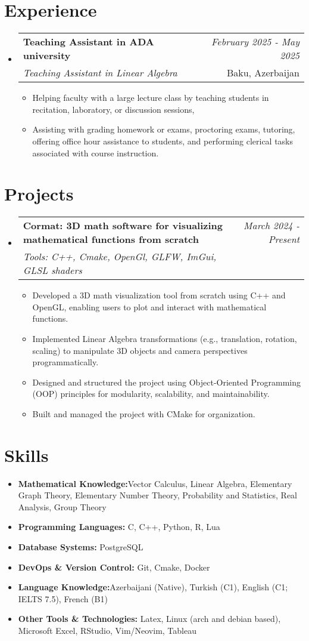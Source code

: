 \documentclass[a4paper,11pt]{article}
\makeatletter
\newcommand{\resumeItem}[2]{
\item{
        \textbf{#1}{\hspace{0.5mm}#2 \vspace{-0.5mm}}
    }
}
\newcommand{\resumeSubheading}[4]{
    \vspace{0.5mm}
\item
    \begin{tabular*}{0.98\textwidth}[t]{l@{\extracolsep{\fill}}r}
        \textbf{#1} & \textit{\footnotesize{#4}} \\
        \textit{\footnotesize{#3}} &  \footnotesize{#2}\\
    \end{tabular*}
    \vspace{-2.4mm}
}
\newcommand{\resumeProject}[4]{
    \vspace{0.5mm}
\item
    \begin{tabular*}{0.98\textwidth}[t]{l@{\extracolsep{\fill}}r}
        \textbf{#1} & \textit{\footnotesize{#3}} \\
        \footnotesize{\textit{#2}} & \footnotesize{#4}
    \end{tabular*}
    \vspace{-2.4mm}
}
\newcommand{\resumeSubItem}[2]{\resumeItem{#1}{#2}\vspace{-4pt}}
\newcommand{\resumeSubHeadingListStart}{
\begin{itemize}[leftmargin=*,labelsep=1mm]}
\newcommand{\resumeHeadingSkillStart}{
        \begin{itemize}[leftmargin=*,itemsep=1.7mm, rightmargin=2ex]}
\newcommand{\resumeItemListStart}{
                \begin{itemize}[leftmargin=*,labelsep=1mm,itemsep=0.5mm]}
\newcommand{\resumeSubHeadingListEnd}{
                    \end{itemize}\vspace{2mm}}
\newcommand{\resumeHeadingSkillEnd}{
            \end{itemize}\vspace{-2mm}}
\newcommand{\resumeItemListEnd}{
    \end{itemize}\vspace{-2mm}}
\makeatother
\begin{document}
\section{\textbf{Experience}}
\vspace{-0.4mm}
\resumeSubHeadingListStart
\resumeSubheading
{{Teaching Assistant in ADA university }}{Baku, Azerbaijan}
{Teaching Assistant in Linear Algebra}{February 2025 - May 2025}
\resumeItemListStart
\item Helping faculty with a large
lecture class by teaching students in recitation, laboratory, or discussion sessions,
\item Assisting with
grading homework or exams, proctoring exams, tutoring, offering office hour assistance to students,
and performing clerical tasks associated with course instruction.
\resumeItemListEnd
\resumeSubHeadingListEnd
\vspace{-6mm}

\section{\textbf{Projects}}
\vspace{-0.4mm}
\resumeSubHeadingListStart
\resumeProject
{Cormat: 3D math software for visualizing mathematical functions from scratch}
{Tools: C++, Cmake, OpenGl, GLFW, ImGui, GLSL shaders}
{March 2024 - Present}
{{}\href{https://github.com/JosephMehdiyev/cormat}{\textcolor{darkblue}{\faGithub}}}
\resumeItemListStart
\item Developed a 3D math visualization tool from scratch using C++ and OpenGL, enabling users to plot and interact with mathematical functions.
\item Implemented Linear Algebra transformations (e.g., translation, rotation, scaling) to manipulate 3D objects and camera perspectives
programmatically.
\item Designed and structured the project using Object-Oriented Programming (OOP) principles for modularity, scalability, and maintainability.
\item Built and managed the project with CMake for organization.
\resumeItemListEnd
\resumeSubHeadingListEnd
\vspace{-6mm}

\section{\textbf{Skills}}
\vspace{-0.4mm}
\resumeHeadingSkillStart
\resumeSubItem{Mathematical Knowledge:}
{Vector Calculus, Linear Algebra, Elementary Graph Theory, Elementary Number Theory, Probability and Statistics, Real Analysis, Group Theory}
\resumeSubItem{Programming Languages:}
{ C, C++, Python, R, Lua}
\resumeSubItem{Database Systems:}
{ PostgreSQL}
\resumeSubItem{DevOps \& Version Control:}
{ Git, Cmake, Docker }
\resumeSubItem{Language Knowledge:}
{Azerbaijani (Native), Turkish (C1), English (C1; IELTS 7.5), French (B1)}
\resumeSubItem{Other Tools \& Technologies:}
{ Latex, Linux (arch and debian based), Microsoft Excel, RStudio, Vim/Neovim, Tableau}
\resumeHeadingSkillEnd
\end{document}
